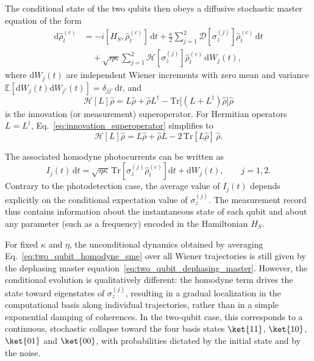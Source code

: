 The conditional state of the two qubits then obeys a diffusive stochastic master equation of the form
\begin{equation}
	\begin{aligned}
		\mathrm{d}\hat{\rho}_t^{(c)}
		&= - i [H_S, \hat{\rho}_t^{(c)}]\, \mathrm{d}t
		+ \frac{\kappa}{2}\sum_{j=1}^{2} 
		\mathcal{D}[\sigma_z^{(j)}]\hat{\rho}_t^{(c)} \,\mathrm{d}t \\
		&\quad + \sqrt{\eta\kappa}\sum_{j=1}^{2}
		\mathcal{H}[\sigma_z^{(j)}]\hat{\rho}_t^{(c)} \,\mathrm{d}W_j(t),
	\end{aligned}
	\label{eq:two_qubit_homodyne_sme}
\end{equation}
where $\mathrm{d}W_j(t)$ are independent Wiener increments with zero mean and variance $\mathbb{E}[\mathrm{d}W_j(t)\mathrm{d}W_{j'}(t)] = \delta_{jj'}\, \mathrm{d}t$, and
\begin{equation}
	\mathcal{H}[L]\hat{\rho} =
	L \hat{\rho} + \hat{\rho} L^{\dagger}
	- \mathrm{Tr}\bigl[(L + L^{\dagger})\hat{\rho}\bigr] \hat{\rho}
	\label{eq:innovation_superoperator}
\end{equation}
is the innovation (or measurement) superoperator.  
For Hermitian operators $L = L^{\dagger}$, Eq.~\eqref{eq:innovation_superoperator} simplifies to
\begin{equation}
	\mathcal{H}[L]\hat{\rho} =
	L \hat{\rho} + \hat{\rho} L
	- 2\,\mathrm{Tr}[L \hat{\rho}] \, \hat{\rho}.
\end{equation}

The associated homodyne photocurrents can be written as
\begin{equation}
	I_j(t)\, \mathrm{d}t =
	\sqrt{\eta\kappa}\,\mathrm{Tr}\!\left[\sigma_z^{(j)} \hat{\rho}_t^{(c)}\right] \mathrm{d}t
	+ \mathrm{d}W_j(t),
	\qquad j = 1,2.
	\label{eq:two_qubit_homodyne_current}
\end{equation}
Contrary to the photodetection case, the average value of $I_j(t)$ depends explicitly on the conditional expectation value of $\sigma_z^{(j)}$.  
The measurement record thus contains information about the instantaneous state of each qubit and about any parameter (such as a frequency) encoded in the Hamiltonian $H_S$.

For fixed $\kappa$ and $\eta$, the unconditional dynamics obtained by averaging Eq.~\eqref{eq:two_qubit_homodyne_sme} over all Wiener trajectories is still given by the dephasing master equation~\eqref{eq:two_qubit_dephasing_master}.  
However, the conditional evolution is qualitatively different:  
the homodyne term drives the state toward eigenstates of $\sigma_z^{(j)}$, resulting in a gradual localization in the computational basis along individual trajectories, rather than in a simple exponential damping of coherences.  
In the two-qubit case, this corresponds to a continuous, stochastic collapse toward the four basis states $\ket{11}$, $\ket{10}$, $\ket{01}$ and $\ket{00}$, with probabilities dictated by the initial state and by the noise.


